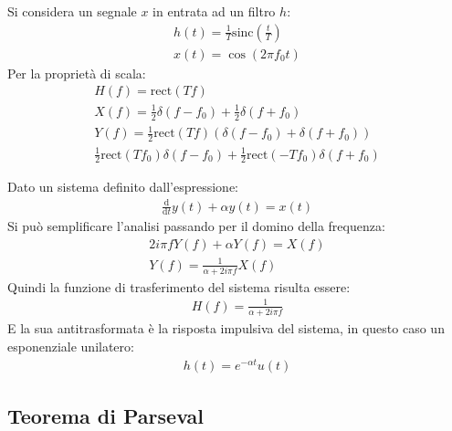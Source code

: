 \documentclass{article}
\newcommand{\rect}{\mathrm{rect}}
\newcommand{\sinc}{\mathrm{sinc}}
\newcommand{\df}{\mathrm{d}}
\numberwithin{equation}{subsection}
\begin{document}
Si considera un segnale $x$ in entrata ad un filtro $h$:
\begin{gather*}
    h(t)=\displaystyle\frac{1}{T}\sinc\left(\frac{t}{T}\right)\\
    x(t)=\cos(2\pi f_0t)
\end{gather*}
Per la proprietà di scala:
\begin{gather*}
    H(f)=\rect(Tf)\\
    X(f)=\displaystyle\frac{1}{2}\delta(f-f_0)+\frac{1}{2}\delta(f+f_0)\\
    Y(f)=\frac{1}{2}\rect(Tf)(\delta(f-f_0)+\delta(f+f_0))\\
    \displaystyle\frac{1}{2}\rect(Tf_0)\delta(f-f_0)+\frac{1}{2}\rect(-Tf_0)\delta(f+f_0)
\end{gather*}


Dato un sistema definito dall'espressione:
\begin{gather*}
    \displaystyle\frac{\df}{\df t}y(t)+\alpha y(t)=x(t)
\end{gather*}
Si può semplificare l'analisi passando per il domino della frequenza: 
\begin{gather*}
    2i\pi fY(f)+\alpha Y(f)=X(f)\\
    Y(f)=\displaystyle\frac{1}{\alpha+2i\pi f}X(f)
\end{gather*}
Quindi la funzione di trasferimento del sistema risulta essere:
\begin{gather*}
    H(f)=\displaystyle\frac{1}{\alpha+2i\pi f}
\end{gather*}
E la sua antitrasformata è la risposta impulsiva del sistema, in questo caso un esponenziale unilatero: 
\begin{gather*}
    h(t)=e^{-\alpha t}u(t)
\end{gather*}

\subsection{Teorema di Parseval}
\end{document}
